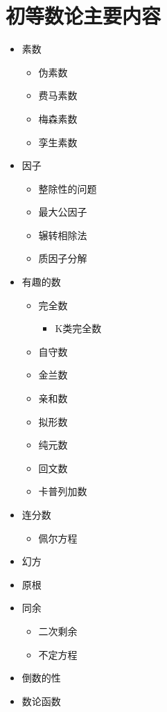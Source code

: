 \documentclass{ctexrep}
\begin{document}
\chapter{初等数论主要内容}
\begin{itemize}
\item 素数
  \begin{itemize}
  \item 伪素数
  \item 费马素数
  \item 梅森素数
  \item 孪生素数
  \end{itemize}
\item 因子
  \begin{itemize}
  \item 整除性的问题
  \item 最大公因子
  \item 辗转相除法
  \item 质因子分解
  \end{itemize}
\item 有趣的数
  \begin{itemize}
  \item 完全数
    \begin{itemize}
    \item K类完全数
    \end{itemize}
  \item 自守数
  \item 金兰数
  \item 亲和数
  \item 拟形数
  \item 纯元数
  \item 回文数
  \item 卡普列加数
  \end{itemize}
\item 连分数
  \begin{itemize}
  \item 佩尔方程
  \end{itemize}
\item 幻方
\item 原根
\item 同余
  \begin{itemize}
  \item 二次剩余
  \item 不定方程
  \end{itemize}
\item 倒数的性
\item 数论函数
  \begin{itemize}

\end{itemize}
\end{itemize}
\end{document}
